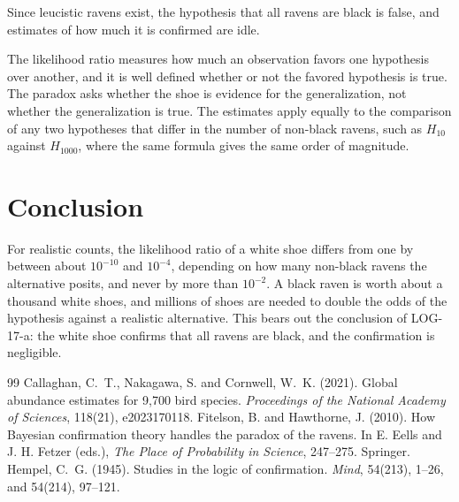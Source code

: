 \documentclass{situationist-preprint}
\begin{document}
\begin{objection}
Since leucistic ravens exist, the hypothesis that all ravens are black is false, and estimates of how much it is confirmed are idle.
\end{objection}

\begin{reply}
The likelihood ratio measures how much an observation favors one hypothesis over another, and it is well defined whether or not the favored hypothesis is true. The paradox asks whether the shoe is evidence for the generalization, not whether the generalization is true. The estimates apply equally to the comparison of any two hypotheses that differ in the number of non-black ravens, such as $H_{10}$ against $H_{1000}$, where the same formula gives the same order of magnitude.
\end{reply}

\section{Conclusion}

For realistic counts, the likelihood ratio of a white shoe differs from one by between about $10^{-10}$ and $10^{-4}$, depending on how many non-black ravens the alternative posits, and never by more than $10^{-2}$. A black raven is worth about a thousand white shoes, and millions of shoes are needed to double the odds of the hypothesis against a realistic alternative. This bears out the conclusion of LOG-17-a: the white shoe confirms that all ravens are black, and the confirmation is negligible.

\begin{thebibliography}{99}\small
{} Callaghan, C.~T., Nakagawa, S. and Cornwell, W.~K. (2021). Global abundance estimates for 9,700 bird species. \emph{Proceedings of the National Academy of Sciences}, 118(21), e2023170118.
 Fitelson, B. and Hawthorne, J. (2010). How Bayesian confirmation theory handles the paradox of the ravens. In E. Eells and J. H. Fetzer (eds.), \emph{The Place of Probability in Science}, 247--275. Springer.
 Hempel, C.~G. (1945). Studies in the logic of confirmation. \emph{Mind}, 54(213), 1--26, and 54(214), 97--121.
\end{thebibliography}
\end{document}
